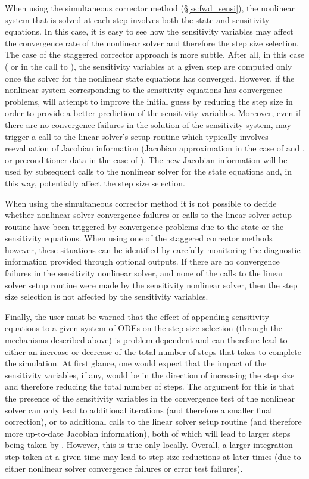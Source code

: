 When using the simultaneous corrector method (\S\ref{ss:fwd_sensi}),
the nonlinear system that is solved at each step involves both the state
and sensitivity equations. In this case, it is easy to see how the sensitivity 
variables may affect the convergence rate of the nonlinear solver and therefore
the step size selection. 
The case of the staggered corrector approach is more subtle. 
After all, in this case ( or  in the call 
to ), the sensitivity variables at a given step are 
computed only once the solver for the nonlinear state equations has converged.
However, if the nonlinear system corresponding to the sensitivity equations
has convergence problems, {\idas} will attempt to improve the initial guess
by reducing the step size in order to provide a better prediction of the
sensitivity variables. Moreover, even if there are no convergence failures in
the solution of the sensitivity system, {\idas} may trigger a call to the
linear solver's setup routine which typically involves reevaluation of Jacobian
information (Jacobian approximation in the case of {\idadense} and {\idaband}, or
preconditioner data in the case of {\idaspgmr}). The new Jacobian information
will be used by subsequent calls to the nonlinear solver for the state equations
and, in this way, potentially affect the step size selection.

When using the simultaneous corrector method it is not possible to decide whether 
nonlinear solver convergence failures or calls to the linear solver setup routine
have been triggered by convergence problems due to the state or the sensitivity 
equations.
When using one of the staggered corrector methods however, these situations can be 
identified by carefully monitoring the diagnostic information provided through 
optional outputs. If there are no convergence
failures in the sensitivity nonlinear solver, and none
of the calls to the linear solver setup routine were made by the sensitivity
nonlinear solver, then the step size selection is
not affected by the sensitivity variables.

Finally, the user must be warned that the effect of appending sensitivity 
equations to a given system of ODEs on the step size selection 
(through the mechanisms described above) is problem-dependent and can therefore
lead to either an increase or decrease of the total number of steps that {\idas} takes
to complete the simulation. At first glance, one would expect that the impact
of the sensitivity variables, if any, would be in the direction of increasing the
step size and therefore reducing the total number of steps. The argument for this
is that the presence of the sensitivity variables in the convergence test of the
nonlinear solver can only lead to additional iterations (and therefore a smaller
final correction), or to additional calls to the linear solver setup routine
(and therefore more up-to-date Jacobian information), both of which will lead
to larger steps being taken by {\idas}. However, this is true only locally.
Overall, a larger integration step taken at a given time may lead to 
step size reductions at later times (due to either nonlinear solver convergence
failures or error test failures).
